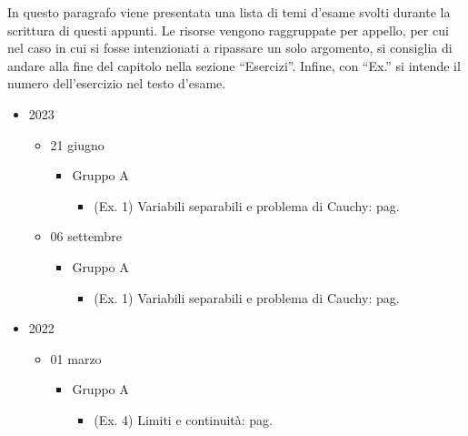 \documentclass[a4paper]{article}
\newcommand{\dquotes}[1]{``#1''}
\begin{document}
	In questo paragrafo viene presentata una lista di temi d'esame svolti durante la scrittura di questi appunti. Le risorse vengono raggruppate per appello, per cui nel caso in cui si fosse intenzionati a ripassare un solo argomento, si consiglia di andare alla fine del capitolo nella sezione \dquotes{Esercizi}. Infine, con \dquotes{Ex.} si intende il numero dell'esercizio nel testo d'esame.
	\begin{itemize}
		\item 2023
		\begin{itemize}
			\item 21 giugno
			\begin{itemize}
				\item Gruppo A
				\begin{itemize}
					\item (Ex. 1) Variabili separabili e problema di Cauchy: pag. \pageref{exam: esame 21 giugno 2023 - Gruppo A - 1 esercizio}
				\end{itemize}
			\end{itemize}

			\item 06 settembre
			\begin{itemize}
				\item Gruppo A
				\begin{itemize}
					\item (Ex. 1) Variabili separabili e problema di Cauchy: pag. \pageref{exam: esame 06 settembre 2023 - Gruppo A - 1 esercizio}
				\end{itemize}
			\end{itemize}
		\end{itemize}

		\item 2022
		\begin{itemize}
			\item 01 marzo
			\begin{itemize}
				\item Gruppo A
				\begin{itemize}
					\item (Ex. 4) Limiti e continuità: pag. \pageref{exam: esame 01 marzo 2022 - Gruppo A - 4 esercizio}
				\end{itemize}
			\end{itemize}
		\end{itemize}
	\end{itemize}
\end{document}
